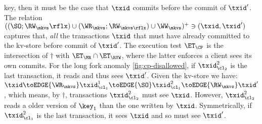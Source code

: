 key, then it {must} be
the case that $\txid$ commits before the commit of $\txid'$.
The relation $((\SO ; \RW_{\mkvs}\rflx) \cup (\WR_{\mkvs} ; \RW_{\mkvs\rflx}) \cup \WW_\mkvs )^{+} \ni (\txid, \txid')$
captures that, {\em all} the transactions $\txid$ that {must} have already committed to the kv-store before commit of \( \txid' \).
The execution test $\ET_{\CP}$ is the intersection of $\dagger$ with $\ET_\MR \cap \ET_\RYW$,
where the latter enforces a client sees its own commits.
For the long fork anomaly \cref{fig:cp-disallowed},
if \( \txid_{\cl_2}^2\) is the last transaction, it reads and thus sees \( \txid' \).
Given the kv-store we have:
\(
\txid \toEDGE{\WR_\mkvs} \txid^1_{\cl_1} \toEDGE{\SO} \txid^2_{\cl_1} \toEDGE{\RW_\mkvs} \txid'
\),
which means, by \( \dagger \), transactions \( \txid_{\cl_2}^2 \) must see \( \txid \).
However, \(  \txid_{\cl_2}^2 \) reads a older version of \( \key_1 \) than the one written by \( \txid \).
Symmetrically,
if \( \txid_{\cl_1}^2\) is the last transaction, it sees \( \txid \) and so must see \( \txid' \).

